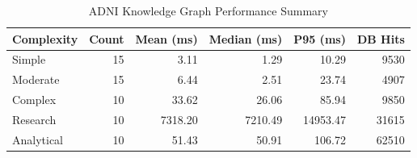 \begin{table}[htbp]
\centering
\caption{ADNI Knowledge Graph Performance Summary}
\label{tab:performance_summary}
\begin{tabular}{|l|r|r|r|r|r|}
\hline
\textbf{Complexity} & \textbf{Count} & \textbf{Mean (ms)} & \textbf{Median (ms)} & \textbf{P95 (ms)} & \textbf{DB Hits} \\
\hline
Simple & 15 & 3.11 & 1.29 & 10.29 & 9530 \\
Moderate & 15 & 6.44 & 2.51 & 23.74 & 4907 \\
Complex & 10 & 33.62 & 26.06 & 85.94 & 9850 \\
Research & 10 & 7318.20 & 7210.49 & 14953.47 & 31615 \\
Analytical & 10 & 51.43 & 50.91 & 106.72 & 62510 \\
\hline
\end{tabular}
\end{table}
